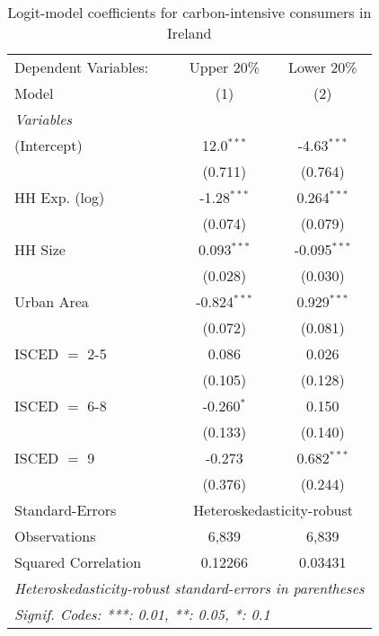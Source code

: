 
\begin{table}[htbp!]
   \centering
   \small
   \begin{adjustbox}{width = 1\textwidth, max height = 0.95\textheight, center}
      \begin{threeparttable}[b]
         \caption{\label{tab:Logit_1_IRL} Logit-model coefficients for carbon-intensive consumers in Ireland}
         \begin{tabular}{lcc}
            \tabularnewline \midrule \midrule
            Dependent Variables: & Upper 20\%     & Lower 20\%\\   
            Model                & (1)            & (2)\\  
            \midrule
            \emph{Variables}\\
            (Intercept)          & 12.0$^{***}$   & -4.63$^{***}$\\   
                                 & (0.711)        & (0.764)\\   
            HH Exp. (log)        & -1.28$^{***}$  & 0.264$^{***}$\\   
                                 & (0.074)        & (0.079)\\   
            HH Size              & 0.093$^{***}$  & -0.095$^{***}$\\   
                                 & (0.028)        & (0.030)\\   
            Urban Area           & -0.824$^{***}$ & 0.929$^{***}$\\   
                                 & (0.072)        & (0.081)\\   
            ISCED $=$ 2-5        & 0.086          & 0.026\\   
                                 & (0.105)        & (0.128)\\   
            ISCED $=$ 6-8        & -0.260$^{*}$   & 0.150\\   
                                 & (0.133)        & (0.140)\\   
            ISCED $=$ 9          & -0.273         & 0.682$^{***}$\\   
                                 & (0.376)        & (0.244)\\   
            \midrule 
            Standard-Errors & \multicolumn{2}{c}{Heteroskedasticity-robust} \\ 
            Observations         & 6,839          & 6,839\\  
            Squared Correlation  & 0.12266        & 0.03431\\  
            \midrule \midrule
            \multicolumn{3}{l}{\emph{Heteroskedasticity-robust standard-errors in parentheses}}\\
            \multicolumn{3}{l}{\emph{Signif. Codes: ***: 0.01, **: 0.05, *: 0.1}}\\
         \end{tabular}
         

\end{threeparttable}
\end{adjustbox}
\end{table}
